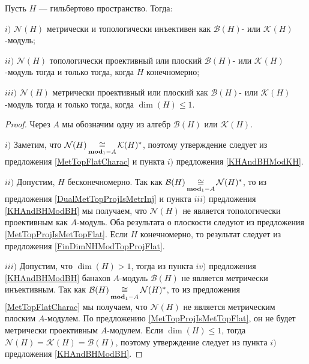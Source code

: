 \begin{proposition}\label{KHAndBHModNH} Пусть $H$ --- гильбертово пространство. Тогда:

$i)$ $\mathcal{N}(H)$ метрически и топологически инъективен как $\mathcal{B}(H)$- или $\mathcal{K}(H)$-модуль;

$ii)$ $\mathcal{N}(H)$ топологически проективный или плоский $\mathcal{B}(H)$- или $\mathcal{K}(H)$-модуль тогда и только тогда, когда $H$ конечномерно;

$iii)$ $\mathcal{N}(H)$ метрически проективный или плоский как $\mathcal{B}(H)$- или $\mathcal{K}(H)$-модуль тогда и только тогда, когда $\dim(H)\leq 1$.
\end{proposition}
\begin{proof} Через $A$ мы обозначим одну из алгебр $\mathcal{B}(H)$ или $\mathcal{K}(H)$.

$i)$ Заметим, что $\mathcal{N}(H)\mathop{\mathbin{\cong}}\limits_{\mathbf{mod}_1-A}\mathcal{K}(H)^*$, поэтому утверждение следует из предложения \ref{MetTopFlatCharac} и пункта $i)$ предложения \ref{KHAndBHModKH}.

$ii)$ Допустим, $H$ бесконечномерно. Так как $\mathcal{B}(H)\mathop{\mathbin{\cong}}\limits_{\mathbf{mod}_1-A}\mathcal{N}(H)^*$, то из предложения \ref{DualMetTopProjIsMetrInj} и пункта $iii)$ предложения \ref{KHAndBHModBH} мы получаем, что $\mathcal{N}(H)$ не является топологически проективным как $A$-модуль. Оба результата о плоскости следуют из предложения \ref{MetTopProjIsMetTopFlat}. Если $H$ конечномерно, то результат следует из предложения \ref{FinDimNHModTopProjFlat}.

$iii)$ Допустим, что $\dim(H)>1$, тогда из пункта $iv)$ предложения \ref{KHAndBHModBH} банахов $A$-модуль $\mathcal{B}(H)$ не является метрически инъективным. Так как $\mathcal{B}(H)\mathop{\mathbin{\cong}}\limits_{\mathbf{mod}_1-A}\mathcal{N}(H)^*$, то из предложения \ref{MetTopFlatCharac} мы получаем, что $\mathcal{N}(H)$ не является метрическим плоским $A$-модулем. По предложению \ref{MetTopProjIsMetTopFlat}, он не будет метрически проективным $A$-модулем. Если $\dim(H)\leq 1$, тогда $\mathcal{N}(H)=\mathcal{K}(H)=\mathcal{B}(H)$, поэтому утверждение следует из пункта $i)$ предложения \ref{KHAndBHModBH}.
\end{proof}

